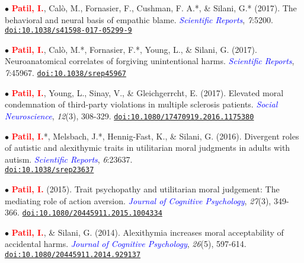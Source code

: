 \documentclass[10pt]{article}
\begin{document}
	$\bullet$ \textbf{\textcolor{red}{Patil, I.}}, Cal\`{o}, M., Fornasier, F., Cushman, F. A.*, \& Silani, G.* (2017). The behavioral and neural basis of \hspace*{0.1in}empathic blame. 
	\textit{\textcolor{blue}{Scientific Reports}}, \textit{7}:5200. \href{https://drive.google.com/open?id=0B6_u70YpdJKnT1J6dkk5R1NPZDg}{\tt doi:10.1038/s41598-017-05299-9}
	\miniskip
	
	$\bullet$ \textbf{\textcolor{red}{Patil, I.}}, Cal\`{o}, M.*, Fornasier, F.*, Young, L., \& Silani, G. (2017). Neuroanatomical correlates of forgiving \hspace*{0.1in}unintentional harms. \textit{\textcolor{blue}{Scientific Reports}}, \textit{7}:45967. \href{https://drive.google.com/open?id=0B6_u70YpdJKnRV81UnNlZHdrdXM}{\tt doi:10.1038/srep45967}
	\miniskip
	
	$\bullet$ \textbf{\textcolor{red}{Patil, I.}}, Young, L., Sinay, V., \& Gleichgerrcht, E. (2017). Elevated moral condemnation of third-party \hspace*{0.1in}violations in multiple sclerosis patients. \textit{\textcolor{blue}{Social Neuroscience}}, \textit{12}(3), 308-329. \hspace*{0.1in}\href{https://drive.google.com/open?id=0B6_u70YpdJKnT3M0bWpPdDY4RHc}{\tt doi:10.1080/17470919.2016.1175380}
	\miniskip
	
	$\bullet$ \textbf{\textcolor{red}{Patil, I.}}*, Melsbach, J.*, Hennig-Fast, K., \& Silani, G. (2016). Divergent roles of autistic and alexithymic \hspace*{0.1in}traits in utilitarian moral judgments in adults with autism. \textit{\textcolor{blue}{Scientific Reports}}, \textit{6}:23637.\\
	\hspace*{0.1in}\href{https://drive.google.com/file/d/0B6_u70YpdJKnV1p2UmNwa09iS1k/view?usp=sharing}{\tt doi:10.1038/srep23637}
	\miniskip
	
	$\bullet$ \textbf{\textcolor{red}{Patil, I.}} (2015). Trait psychopathy and utilitarian moral judgement: The mediating role of action aversion. \hspace*{0.1in}\textit{\textcolor{blue}{Journal of Cognitive Psychology}}, \textit{27}(3), 349-366. \href{https://drive.google.com/file/d/0B6_u70YpdJKnQjVJUFgtR2ZmWTVqZGxRMEFfemVIOUVuME5Z/view?usp=sharing}{\tt doi:10.1080/20445911.2015.1004334}
	\miniskip
	
	$\bullet$ \textbf{\textcolor{red}{Patil, I.}}, \& Silani, G. (2014). Alexithymia increases moral acceptability of accidental harms. \textit{\textcolor{blue}{Journal of \hspace*{0.1in}Cognitive Psychology}}, \textit{26}(5), 597-614. \href{https://drive.google.com/file/d/0B6_u70YpdJKnMU5pVHRUM3p0SFk/view?usp=sharing}{\tt doi:10.1080/20445911.2014.929137}
	\miniskip
	
\end{document}
